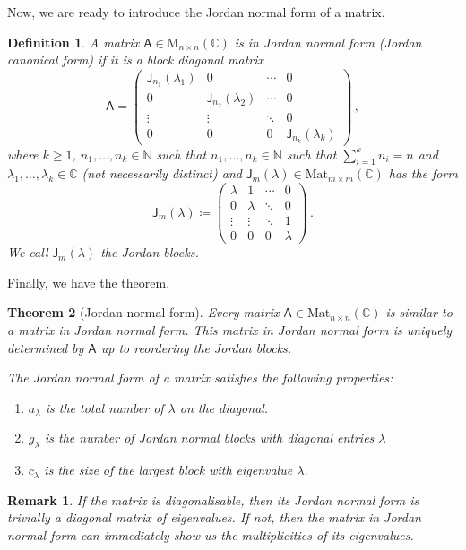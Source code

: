 \documentclass{article}
\theoremstyle{plain}\theoremheaderfont{\normalfont\itshape}\theorembodyfont{\rmfamily}\theoremseparator{.}\newtheorem*{rem}{Remark}\newtheorem*{ex}{Example}\newtheorem*{proof}{Proof}\newtheorem*{altp}{Alternative proof}
\theoremstyle{plain}\theoremheaderfont{\normalfont\bfseries}\theorembodyfont{\rmfamily}\theoremseparator{.}\newtheorem{thm}{Theorem}[section]\newtheorem{lem}[thm]{Lemma}\newtheorem{prop}[thm]{Proposition}\newtheorem*{cor}{Corollary}\newtheorem{defn}[thm]{Definition}\newtheorem{clm}[thm]{Claim}\newtheorem{clminproof}{Claim}
\theoremstyle{break}\theoremheaderfont{\normalfont\itshape}\theorembodyfont{\rmfamily}\theoremseparator{.\medskip}\newtheorem*{proofskip}{Proof}\newtheorem*{exs}{Examples}\newtheorem*{rems}{Remarks}
\theoremstyle{break}\theoremheaderfont{\normalfont\bfseries}\theorembodyfont{\rmfamily}\theoremseparator{.\medskip}\newtheorem{lemskip}[thm]{Lemma}\newtheorem{defnskip}[thm]{Definition}\newtheorem{propskip}[thm]{Proposition}\newtheorem{thmskip}[thm]{Theorem}
\numberwithin{equation}{section}
\begin{document}
	Now, we are ready to introduce the Jordan normal form of a matrix.
	\begin{defn}
		A matrix \(\mathsf{A}\in\mathrm{M}_{n\times n}(\mathbb{C})\) is in \textit{Jordan normal form} (\textit{Jordan canonical form}) if it is a block diagonal matrix
		\[\mathsf{A}=\begin{pmatrix}
			\mathsf{J}_{n_1}(\lambda_1) & 0 & \cdots & 0\\
			0 & \mathsf{J}_{n_2}(\lambda_2) & \cdots & 0\\
			\vdots & \vdots & \ddots & 0\\
			0 & 0 & 0 & \mathsf{J}_{n_k}(\lambda_k)
		\end{pmatrix}\,,\]
		where \(k\ge 1\), \(n_1,\dots,n_k\in\mathbb{N}\) such that \(n_1,\dots,n_k\in\mathbb{N}\) such that \(\sum_{i=1}^{k}n_i=n\) and \(\lambda_1,\dots,\lambda_k\in\mathbb{C}\) (not necessarily distinct) and \(\mathsf{J}_{m}(\lambda)\in\mathrm{Mat}_{m\times m}(\mathbb{C})\) has the form
		\[\mathsf{J}_m(\lambda)\coloneqq\begin{pmatrix}
			\lambda & 1 & \cdots & 0\\
			0 & \lambda & \ddots & 0\\
			\vdots & \vdots & \ddots & 1\\
			0 & 0 & 0 & \lambda
		\end{pmatrix}\,.\]
		We call \(\mathsf{J}_m(\lambda)\) the \textit{Jordan blocks}.
	\end{defn}
	Finally, we have the theorem.
	\begin{thm}[Jordan normal form]
		Every matrix \(\mathsf{A}\in\mathrm{Mat}_{n\times n}(\mathbb{C})\) is similar to a matrix in Jordan normal form. This matrix in Jordan normal form is uniquely determined by \(\mathsf{A}\) up to reordering the Jordan blocks.

		The Jordan normal form of a matrix satisfies the following properties:
		\begin{enumerate}[topsep=0pt]
			\item \(a_\lambda\) is the total number of \(\lambda\) on the diagonal.
			\item \(g_\lambda\) is the number of Jordan normal blocks with diagonal entries \(\lambda\)
			\item \(c_\lambda\) is the size of the largest block with eigenvalue \(\lambda\). 
		\end{enumerate}
	\end{thm}
	\begin{rem}
		If the matrix is diagonalisable, then its Jordan normal form is trivially a diagonal matrix of eigenvalues. If not, then the matrix in Jordan normal form can immediately show us the multiplicities of its eigenvalues.
	\end{rem}
\end{document}
